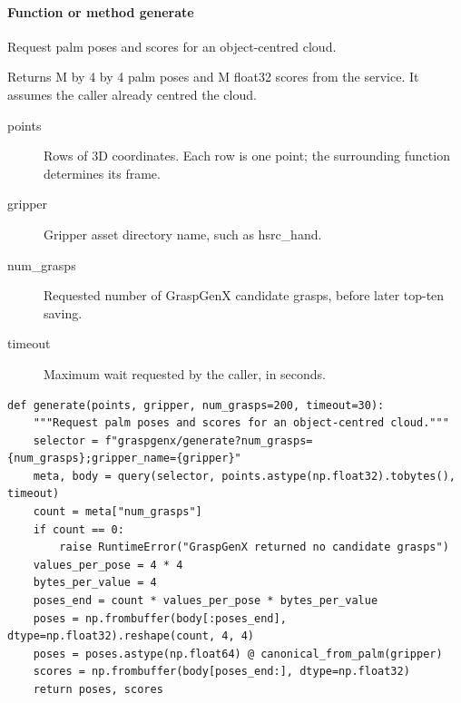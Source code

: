 \documentclass[11pt,a4paper]{book}
\begin{document}
\paragraph{Function or method generate}
Request palm poses and scores for an object-centred cloud.

Returns M by 4 by 4 palm poses and M float32 scores from the service. It assumes the caller already centred the cloud.

\begin{description}
\item[points] Rows of 3D coordinates. Each row is one point; the surrounding function determines its frame.
\item[gripper] Gripper asset directory name, such as hsrc\_hand.
\item[num\_grasps] Requested number of GraspGenX candidate grasps, before later top-ten saving.
\item[timeout] Maximum wait requested by the caller, in seconds.
\end{description}

\begin{lstlisting}[firstnumber=8]
def generate(points, gripper, num_grasps=200, timeout=30):
    """Request palm poses and scores for an object-centred cloud."""
    selector = f"graspgenx/generate?num_grasps={num_grasps};gripper_name={gripper}"
    meta, body = query(selector, points.astype(np.float32).tobytes(), timeout)
    count = meta["num_grasps"]
    if count == 0:
        raise RuntimeError("GraspGenX returned no candidate grasps")
    values_per_pose = 4 * 4
    bytes_per_value = 4
    poses_end = count * values_per_pose * bytes_per_value
    poses = np.frombuffer(body[:poses_end], dtype=np.float32).reshape(count, 4, 4)
    poses = poses.astype(np.float64) @ canonical_from_palm(gripper)
    scores = np.frombuffer(body[poses_end:], dtype=np.float32)
    return poses, scores
\end{lstlisting}
\end{document}

